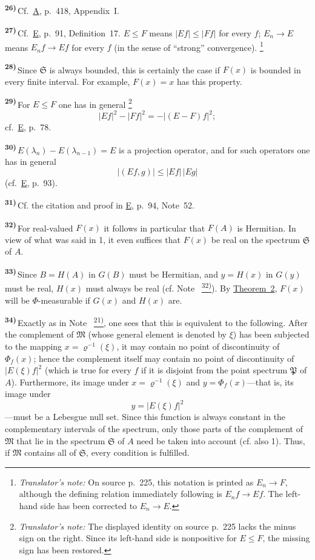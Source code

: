 \documentclass[12pt,b5paper,twoside]{article}
\newcommand{\noteref}[1]{%
  \hyperlink{note:#1}{\textsuperscript{#1)}}}
\newcommand{\originalnote}[1]{%
  \par\smallskip\noindent\hypertarget{note:#1}{\textsuperscript{\textbf{#1)}}}\,}
\newcommand{\translatorfootnote}[2]{%
  \begingroup
  \renewcommand{\thefootnote}{#1}%
  \footnote{\hspace{0.8em}\textit{Translator's note:} #2}%
  \endgroup}
\begin{document}
\originalnote{26}Cf.\ \hyperref[ref:A]{A}, p.~418, Appendix~I.

\originalnote{27}Cf.\ \hyperref[ref:E]{E}, p.~91, Definition~17.  $E\leq F$ means
$| Ef|\leq| Ff|$ for every $f$; $E_n\to E$ means
$E_nf\to Ef$ for every $f$ (in the sense of ``strong'' convergence).\translatorfootnote{T16}{On source p.~225, this notation is printed as $E_n\to F$, although the defining relation immediately following is $E_nf\to Ef$. The left-hand side has been corrected to $E_n\to E$.}

\originalnote{28}Since $\mathfrak{S}$ is always bounded, this is certainly the case
if $F(x)$ is bounded in every finite interval.  For example, $F(x)=x$ has this
property.

\originalnote{29}For $E\leq F$ one has in general\translatorfootnote{T17}{The displayed identity on source p.~225 lacks the minus sign on the right. Since its left-hand side is nonpositive for $E\leq F$, the missing sign has been restored.}
\[
 | Ef|^2-| Ff|^2
 =-|(E-F)f|^2;
\]
cf.\ \hyperref[ref:E]{E}, p.~78.

\originalnote{30}$E(\lambda_n)-E(\lambda_{n-1})=E$ is a projection operator, and
for such operators one has in general
\[
 |(Ef,g)|\leq| Ef|\,| Eg|
\]
(cf.\ \hyperref[ref:E]{E}, p.~93).

\originalnote{31}Cf. the citation and proof in \hyperref[ref:E]{E}, p.~94, Note~52.

\originalnote{32}For real-valued $F(x)$ it follows in particular that $F(A)$ is
Hermitian.  In view of what was said in 1, it even suffices that $F(x)$ be real on the
spectrum $\mathfrak{S}$ of $A$.

\originalnote{33}Since $B=H(A)$ in $G(B)$ must be Hermitian, and $y=H(x)$ in $G(y)$
must be real, $H(x)$ must always be real (cf. Note~\noteref{32}).  By
\hyperref[thm:2]{Theorem~2}, $F(x)$ will be $\Phi$-measurable if $G(x)$ and $H(x)$
are.

\originalnote{34}Exactly as in Note~\noteref{21}, one sees that this is equivalent to
the following.  After the complement of $\mathfrak{M}$ (whose general element is
denoted by $\xi$) has been subjected to the mapping $x=\varrho^{-1}(\xi)$, it may
contain no point of discontinuity of $\Phi_f(x)$; hence the complement itself may
contain no point of discontinuity of $| E(\xi)f|^2$ (which is true for every
$f$ if it is disjoint from the point spectrum $\mathfrak{P}$ of $A$).  Furthermore,
its image under $x=\varrho^{-1}(\xi)$ and $y=\Phi_f(x)$---that is, its image under
\[
 y=| E(\xi)f|^2
\]
---must be a Lebesgue null set.  Since this function is always constant in the
complementary intervals of the spectrum, only those parts of the complement of
$\mathfrak{M}$ that lie in the spectrum $\mathfrak{S}$ of $A$ need be taken into
account (cf. also 1).  Thus, if $\mathfrak{M}$ contains all of $\mathfrak{S}$, every
condition is fulfilled.
\end{document}
